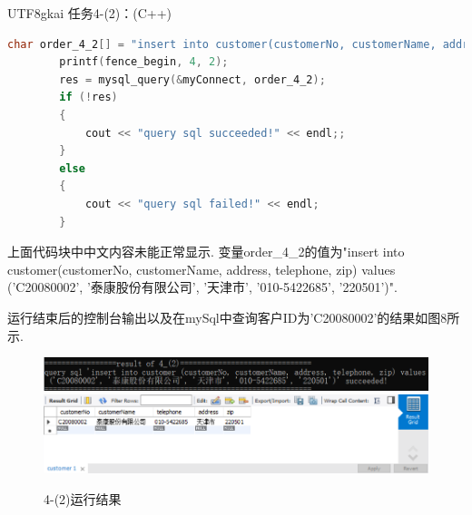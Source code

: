 \documentclass[a4paper,UTF8]{article}
\theoremstyle{definition}
\begin{document}
\begin{CJK}{UTF8}{gkai}
{\heiti \large 任务4-(2)：(C++)}
\begin{lstlisting}[language=C++]
char order_4_2[] = "insert into customer(customerNo, customerName, address, telephone, zip) values ('C20080002', '********', '***', '010-5422685', '220501')";
        printf(fence_begin, 4, 2);
        res = mysql_query(&myConnect, order_4_2);
        if (!res)
        {
            cout << "query sql succeeded!" << endl;;
        }
        else
        {
            cout << "query sql failed!" << endl;
        }
\end{lstlisting}
\par 上面代码块中中文内容未能正常显示. 变量order\_4\_2的值为"insert into customer(customerNo, customerName, address, telephone, zip) values ('C20080002', '泰康股份有限公司', '天津市', '010-5422685', '220501')".
\par 运行结束后的控制台输出以及在mySql中查询客户ID为'C20080002'的结果如图8所示.
\begin{figure}[h]
\centering
\includegraphics[scale=0.7]{./img/4-2-1.png}
\includegraphics[scale=0.7]{./img/4-2-2.png}
\caption{4-(2)运行结果}
\label{fig:label}
\end{figure}


\end{CJK}
\end{document}
